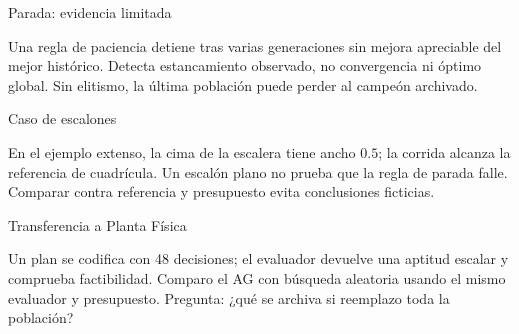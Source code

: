 \begin{frame}{Parada: evidencia limitada}

Una regla de paciencia detiene tras varias generaciones sin mejora apreciable del mejor histórico. Detecta estancamiento observado, no convergencia ni óptimo global. Sin elitismo, la última población puede perder al campeón archivado.

\end{frame}

\begin{frame}{Caso de escalones}

En el ejemplo extenso, la cima de la escalera tiene ancho $0.5$; la corrida alcanza la referencia de cuadrícula. Un escalón plano no prueba que la regla de parada falle. Comparar contra referencia y presupuesto evita conclusiones ficticias.

\end{frame}

\begin{frame}{Transferencia a Planta Física}

Un plan se codifica con 48 decisiones; el evaluador devuelve una aptitud escalar y comprueba factibilidad. Comparo el AG con búsqueda aleatoria usando el mismo evaluador y presupuesto. Pregunta: ¿qué se archiva si reemplazo toda la población?

\end{frame}


